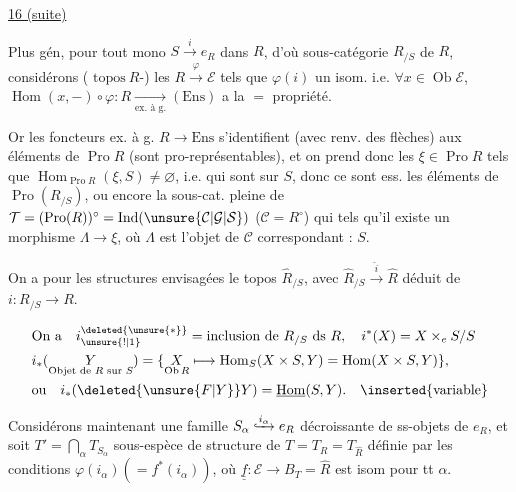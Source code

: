 
\underline{16 (suite)}

Plus gén, pour tout mono $S\xrightarrow{i}e_R$ dans $R$,
d'où sous-catégorie $R_{/S}$ de $R$,  considérons
( $\mathrm{topos}\ R$-) les $R\xrightarrow{\varphi}\mathcal E$  tels que $\varphi(i)$ un isom.
i.e. $\forall x\in\operatorname{Ob}\mathcal E$, $\operatorname{Hom}(x,-)\circ\varphi:R\underset{\text{ex. à g.}}{\longrightarrow}(\mathrm{Ens})$ a la $=$ propriété.

Or les foncteurs ex. à g.  $R\to\mathrm{Ens}$ s'identifient (avec renv. des flèches)
aux éléments de $\operatorname{Pro}R$ (sont pro-représentables), et on prend donc les $\xi\in\operatorname{Pro}R$ tels que
$\operatorname{Hom}_{\operatorname{Pro}R}(\xi,S)\ne\varnothing$, i.e. qui sont sur $S$,
donc ce sont ess. les éléments de $\operatorname{Pro}(R_{/S})$,  ou encore la sous-cat. pleine de
$\mathcal T=(\operatorname{Pro}(R))^\circ=\operatorname{Ind}(\unsure{\mathcal C|\mathcal G|\mathcal S})$ ($\mathcal C=R^\circ$)
 qui  tels qu'il existe un morphisme $\Lambda\to\xi$, où $\Lambda$ est l'objet de $\mathcal C$ correspondant : $S$.

On a pour les structures envisagées le topos 
$\widehat R_{/S}$, avec $\widehat R_{/S}\xrightarrow{\widehat i}\widehat R$ déduit de $i:R_{/S}\to R$.

\[
\begin{aligned}
 &\text{On a}\quad i_{\unsure{!|1}}^{\deleted{\unsure{*}}}=\text{inclusion de $R_{/S}$ ds $R$},
 \quad i^*(X)=X\times_e S/S\\
 &i_*(\underset{\text{Objet de $R$ sur $S$}}Y)
 =\{ \underset{\operatorname{Ob}R}{X}\longmapsto\operatorname{Hom}_S(X\times S,Y)=\operatorname{Hom}(X\times S,Y)\},\\
 &\text{ou}\quad i_*(\deleted{\unsure{F|Y}}Y)=\underline{\operatorname{Hom}}(S,Y).
 \quad\inserted{\text{variable}}
\end{aligned}
\]

Considérons maintenant une famille $S_\alpha\lhook\joinrel\xrightarrow{i_\alpha}e_R$  décroissante
de ss-objets de $e_R$, et soit $T'=\bigcap_\alpha T_{S_\alpha}$  sous-espèce de structure de $T=T_R=T_{\widehat R}$
définie par les conditions $\varphi(i_\alpha)(=f^*(i_\alpha))$, où $\underline{\underline f}:\mathcal E\to B_T=\widehat R$ est isom pour tt $\alpha$.


